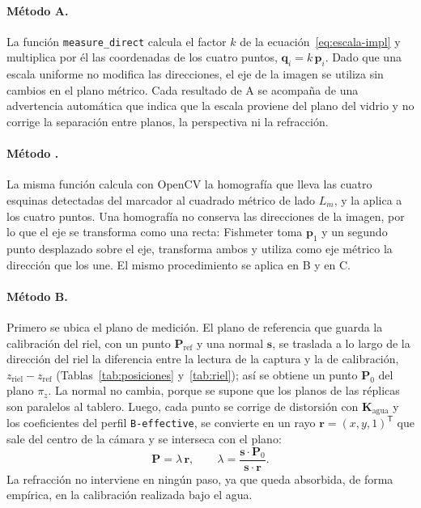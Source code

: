 \paragraph{Método A.} La función \texttt{measure\_direct} calcula el factor $k$ de la ecuación~\eqref{eq:escala-impl} y multiplica por él las coordenadas de los cuatro puntos, $\mathbf{q}_i = k\,\mathbf{p}_i$. Dado que una escala uniforme no modifica las direcciones, el eje de la imagen se utiliza sin cambios en el plano métrico. Cada resultado de A se acompaña de una advertencia automática que indica que la escala proviene del plano del vidrio y no corrige la separación entre planos, la perspectiva ni la refracción.

\paragraph{Método \Aprime.} La misma función calcula con OpenCV la homografía que lleva las cuatro esquinas detectadas del marcador al cuadrado métrico de lado $L_m$, y la aplica a los cuatro puntos. Una homografía no conserva las direcciones de la imagen, por lo que el eje se transforma como una recta: Fishmeter toma $\mathbf{p}_1$ y un segundo punto desplazado sobre el eje, transforma ambos y utiliza como eje métrico la dirección que los une. El mismo procedimiento se aplica en B y en C.

\paragraph{Método B.} Primero se ubica el plano de medición. El plano de referencia que guarda la calibración del riel, con un punto $\mathbf{P}_{\mathrm{ref}}$ y una normal $\mathbf{s}$, se traslada a lo largo de la dirección del riel la diferencia entre la lectura de la captura y la de calibración, $z_{\mathrm{riel}} - z_{\mathrm{ref}}$ (Tablas~\ref{tab:posiciones} y~\ref{tab:riel}); así se obtiene un punto $\mathbf{P}_0$ del plano $\pi_z$. La normal no cambia, porque se supone que los planos de las réplicas son paralelos al tablero. Luego, cada punto se corrige de distorsión con $\mathbf{K}_{\mathrm{agua}}$ y los coeficientes del perfil \texttt{B-effective}, se convierte en un rayo $\mathbf{r} = (x, y, 1)^{\mathsf{T}}$ que sale del centro de la cámara y se interseca con el plano:
\begin{equation}
\mathbf{P} = \lambda\,\mathbf{r}, \qquad \lambda = \frac{\mathbf{s}\cdot\mathbf{P}_0}{\mathbf{s}\cdot\mathbf{r}} .
\label{eq:interseccion-b}
\end{equation}
La refracción no interviene en ningún paso, ya que queda absorbida, de forma empírica, en la calibración realizada bajo el agua.

